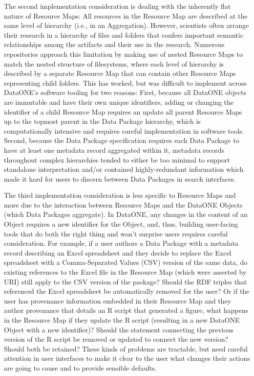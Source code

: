 \documentclass[conference]{IEEEtran}
\begin{document}
The second implementation consideration is dealing with the inherently flat nature of Resource Maps: All resources in the Resource Map are described at the same level of hierarchy (i.e., in an Aggregation).
However, scientists often arrange their research in a hierarchy of files and folders that confers important semantic relationships among the artifacts and their use in the research.
Numerous repositories approach this limitation by making use of nested Resource Maps to match the nested structure of filesystems, where each level of hierarchy is described by a separate Resource Map that can contain other Resource Maps representing child folders.
This has worked, but was difficult to implement across DataONE's software tooling for two reasons:
First, because all DataONE objects are immutable and have their own unique identifiers, adding or changing the identifier of a child Resource Map requires an update all parent Resource Maps up to the topmost parent in the Data Package hierarchy, which is computationally intensive and requires careful implementation in software tools.
Second, because the Data Package specification requires each Data Package to have at least one metadata record aggregated within it, metadata records throughout complex hierarchies tended to either be too minimal to support standalone interpretation and/or contained highly-redundant information which made it hard for users to discern between Data Packages in search interfaces.

The third implementation consideration is less specific to Resource Maps and more due to the interaction between Resource Maps and the DataONE Objects (which Data Packages aggregate).
In DataONE, any changes in the content of an Object requires a new identifier for the Object, and, thus, building user-facing tools that do both the right thing and won’t surprise users requires careful consideration.
For example, if a user authors a Data Package with a metadata record describing an Excel spreadsheet and they decide to replace the Excel spreadsheet with a Comma-Separated Values (CSV) version of the same data, do existing references to the Excel file in the Resource Map (which were asserted by URI) still apply to the CSV version of the package?
Should the RDF triples that referenced the Excel spreadsheet be automatically removed for the user?
Or if the user has provenance information embedded in their Resource Map and they author provenance that details an R script that generated a figure, what happens in the Resource Map if they update the R script (resulting in a new DataONE Object with a new identifier)?
Should the statement connecting the previous version of the R script be removed or updated to connect the new version?
Should both be retained?
These kinds of problems are tractable, but need careful attention in user interfaces to make it clear to the user what changes their actions are going to cause and to provide sensible defaults.
\end{document}
